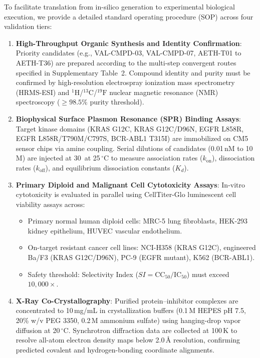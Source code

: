 \documentclass[11pt,a4paper]{article}
\begin{document}
To facilitate translation from in-silico generation to experimental biological execution, we provide a detailed standard operating procedure (SOP) across four validation tiers:

\begin{enumerate}
    \item \textbf{High-Throughput Organic Synthesis and Identity Confirmation}:
    Priority candidates (e.g., VAL-CMPD-03, VAL-CMPD-07, AETH-T01 to AETH-T36) are prepared according to the multi-step convergent routes specified in Supplementary Table~2. Compound identity and purity must be confirmed by high-resolution electrospray ionization mass spectrometry (HRMS-ESI) and $^1\text{H}$/$^{13}\text{C}$/$^{19}\text{F}$ nuclear magnetic resonance (NMR) spectroscopy ($\ge 98.5\%$ purity threshold).
    \item \textbf{Biophysical Surface Plasmon Resonance (SPR) Binding Assays}:
    Target kinase domains (KRAS G12C, KRAS G12C/D96N, EGFR L858R, EGFR L858R/T790M/C797S, BCR-ABL1 T315I) are immobilized on CM5 sensor chips via amine coupling. Serial dilutions of candidates (0.01\,nM to 10\,\textmu M) are injected at 30\,\mu{} at 25\,$^\circ$C to measure association rates ($k_{\text{on}}$), dissociation rates ($k_{\text{off}}$), and equilibrium dissociation constants ($K_d$).
    \item \textbf{Primary Diploid and Malignant Cell Cytotoxicity Assays}:
    In-vitro cytotoxicity is evaluated in parallel using CellTiter-Glo luminescent cell viability assays across:
    \begin{itemize}
        \item Primary normal human diploid cells: MRC-5 lung fibroblasts, HEK-293 kidney epithelium, HUVEC vascular endothelium.
        \item On-target resistant cancer cell lines: NCI-H358 (KRAS G12C), engineered Ba/F3 (KRAS G12C/D96N), PC-9 (EGFR mutant), K562 (BCR-ABL1).
        \item Safety threshold: Selectivity Index ($SI = \text{CC}_{50}/\text{IC}_{50}$) must exceed $10,000\times$.
    \end{itemize}
    \item \textbf{X-Ray Co-Crystallography}:
    Purified protein--inhibitor complexes are concentrated to 10\,mg/mL in crystallization buffers (0.1\,M HEPES pH 7.5, 20\% w/v PEG 3350, 0.2\,M ammonium sulfate) using hanging-drop vapor diffusion at 20\,$^\circ$C. Synchrotron diffraction data are collected at 100\,K to resolve all-atom electron density maps below 2.0\,{{\AA}} resolution, confirming predicted covalent and hydrogen-bonding coordinate alignments.
\end{enumerate}
\end{document}
